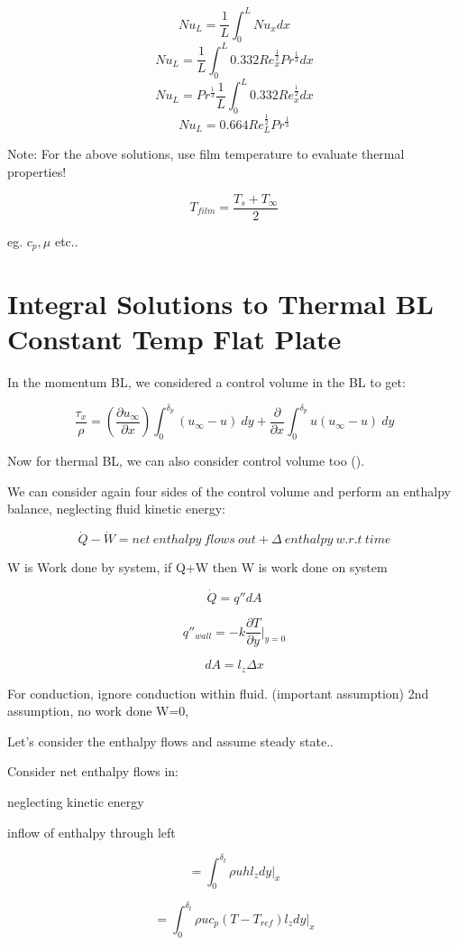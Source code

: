 \documentclass[11pt]{article}
\begin{document}
$$Nu_L = \frac{1}{L} \int_0^L Nu_x dx$$
$$Nu_L = \frac{1}{L} \int_0^L 0.332 Re_x^{\frac{1}{2}}  Pr^{\frac{1}{3}}  dx$$
$$Nu_L = Pr^{\frac{1}{3}} \frac{1}{L}  \int_0^L 0.332 Re_x^{\frac{1}{2}}    dx$$
$$Nu_L = 0.664 Re_L^{\frac{1}{2}} Pr^{\frac{1}{3}}$$


Note: For the above solutions, use film temperature to evaluate thermal properties!

$$T_{film} = \frac{T_s + T_\infty}{2}$$

eg. $c_p, \mu$ etc..

\section{Integral Solutions to Thermal BL Constant Temp Flat Plate}

In the momentum BL, we considered a control volume in the BL to get:

$$ \frac{\tau_x}{\rho} = ( \frac{\partial u_\infty}{\partial x}) \int_0^{\delta_p} ( u_\infty - u ) \ dy  + \frac{\partial}{\partial x}   \int_0^{\delta_p} u( u_\infty - u) \ dy $$

Now for thermal BL, we can also consider control volume too (\cite{welty2014fundamentals}). 



We can consider again four sides of the control volume and perform an enthalpy balance, neglecting fluid kinetic energy:

$$\dot{Q} - \dot{W} = net \ enthalpy \ flows  \ out +  \Delta \ enthalpy \ w.r.t \ time$$

W is Work done by system, if Q+W then W is work done on system

$$\dot{Q} = q'' dA$$

$$q''_{wall} = - k \frac{\partial T}{\partial y} |_{y=0}$$

$$dA = l_z \Delta x$$

For conduction, ignore conduction within fluid. (important assumption)
2nd assumption, no work done W=0,

Let's consider the enthalpy flows and assume steady state..

Consider net enthalpy flows in:

neglecting kinetic energy

inflow of enthalpy through left

$$= \int_0^{\delta_t} \rho u h l_z dy |_{x}$$

$$= \int_0^{\delta_t} \rho u c_p (T-T_{ref}) l_z dy |_{x}$$
\end{document}
